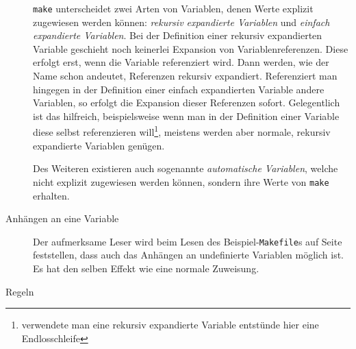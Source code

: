\begin{description}
		\texttt{make} unterscheidet zwei Arten von Variablen, denen Werte
		explizit zugewiesen werden können: \emph{rekursiv expandierte Variablen}
		und \emph{einfach expandierte Variablen}.
		Bei der Definition einer rekursiv expandierten Variable geschieht noch
		keinerlei Expansion von Variablenreferenzen. Diese erfolgt erst, wenn
		die Variable referenziert wird. Dann werden, wie der Name schon
		andeutet, Referenzen rekursiv expandiert.
		Referenziert man hingegen in der Definition einer einfach expandierten
		Variable andere Variablen, so erfolgt die Expansion dieser Referenzen
		sofort. Gelegentlich ist das hilfreich, beispielsweise wenn man in der
		Definition einer Variable diese selbst referenzieren
		will\footnote{verwendete man eine rekursiv expandierte Variable
		entstünde hier eine Endlosschleife}, meistens werden aber normale,
		rekursiv expandierte Variablen genügen.
		
		Des Weiteren existieren auch sogenannte \emph{automatische Variablen},
		welche nicht explizit zugewiesen werden können, sondern ihre Werte von
		\texttt{make} erhalten.
	\item[Anhängen an eine Variable] \hspace{\fill}
	
		
		Der aufmerksame Leser wird beim Lesen des Beispiel-\texttt{Makefile}s
		auf Seite~\pageref{subsubsection:examplemakefile} feststellen, dass
		auch das Anhängen an undefinierte Variablen möglich ist. Es hat den
		selben Effekt wie eine normale Zuweisung.

	\item[Regeln]
	
\end{description}
